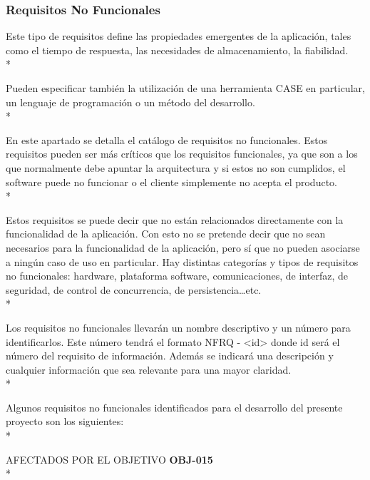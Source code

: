 \documentclass[../pfc.tex]{subfiles}
\begin{document}
	












	\subsubsection{Requisitos No Funcionales}
	
	Este tipo de requisitos define las propiedades emergentes de la aplicación, tales como el tiempo de
	respuesta, las necesidades de almacenamiento, la fiabilidad.\\*
	
	Pueden especificar también la utilización de una herramienta CASE en particular, un lenguaje
	de programación o un método del desarrollo.\\*
	
	En este apartado se detalla el catálogo de requisitos no funcionales. Estos requisitos pueden
	ser más críticos que los requisitos funcionales, ya que son a los que normalmente debe apuntar la
	arquitectura y si estos no son cumplidos, el software puede no funcionar o el cliente simplemente
	no acepta el producto.\\*
	
	Estos requisitos se puede decir que no están relacionados directamente con la funcionalidad
	de la aplicación. Con esto no se pretende decir que no sean necesarios para la funcionalidad de la aplicación,
	pero sí que no pueden asociarse a ningún caso de uso en particular. Hay distintas categorías y tipos
	de requisitos no funcionales: hardware, plataforma software, comunicaciones, de interfaz, de
	seguridad, de control de concurrencia, de persistencia…etc.\\*
	
	Los requisitos no funcionales llevarán un nombre descriptivo y un número para identificarlos.
	Este número tendrá el formato NFRQ - <id> donde id será el número del requisito de información.
	Además se indicará una descripción y cualquier información que sea relevante para una mayor
	claridad.\\*
	
	Algunos requisitos no funcionales identificados para el desarrollo del presente proyecto son
	los siguientes:\\*

	AFECTADOS POR EL OBJETIVO 	\textbf{OBJ-015}\\*
		
\end{document}
